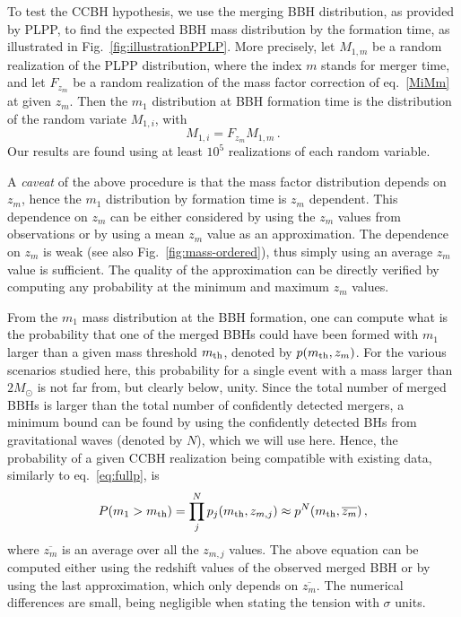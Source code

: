 \documentclass[fleqn,usenatbib,useAMS]{mnras}
\begin{document}
To test the CCBH hypothesis, we use the merging BBH distribution, as provided by PLPP, to find the expected BBH mass distribution by the formation time, as illustrated in Fig.~\ref{fig:illustrationPPLP}. More precisely, let $M_{1, m}$ be a random realization of the PLPP distribution, where the index $m$ stands for merger time, and let $F_{z_m}$ be a random realization of the mass factor correction of eq.~\eqref{MiMm} at given $z_m$. Then the $m_1$ distribution at BBH formation time is the distribution of the random variate $M_{1, i}$, with
\begin{equation} \label{MFM}
    M_{1,i} = F_{z_m} M_{1, m} \, .
\end{equation}
Our results are found using at least $10^5$ realizations of each random variable. 

A \textit{caveat} of the above procedure is that the mass factor distribution depends on $z_m$, hence the $m_1$ distribution by formation time is $z_m$ dependent. This dependence on $z_m$ can be either considered by using the $z_m$ values from observations or by using a mean $z_m$ value as an approximation. The dependence on $z_m$ is weak (see also Fig.~\ref{fig:mass-ordered}), thus simply using an average $z_m$ value is sufficient. The quality of the approximation can be directly verified by computing any probability at the minimum and maximum $z_m$ values.

From the $m_1$ mass distribution at the BBH formation, one can compute what is the probability that one of the merged BBHs could have been formed with $m_1$ larger than a given mass threshold $m_{\rm th}$, denoted by $p(m_{\rm th}, z_m)$. For the various scenarios studied here, this probability for a single event with a mass larger than $2 M_\odot$ is not far from, but clearly below,  unity. Since the total number of merged BBHs is larger than the total number of confidently detected mergers, a minimum bound can be found by using the confidently detected BHs from gravitational waves (denoted by $N$), which we will use here. Hence, the probability of a given CCBH realization being compatible with existing data, similarly to eq.~\eqref{eq:fullp}, is  
\begin{equation} \label{pm1PLPP}
    P (m_1 > m_{\rm th}) = \prod_{j}^N p_j (m_{\rm th}, z_{m,j}) \approx p^N (m_{\rm th}, \overline{z_m}) \, ,
\end{equation}
where $\overline{z_m}$ is an average over all the $z_{m,j}$ values. The above equation can be computed either using the  redshift values of the observed merged BBH or by using the last approximation, which only depends on $\overline{z_m}$. The numerical differences are small, being  negligible when stating the tension with $\sigma$ units. 
\end{document}
